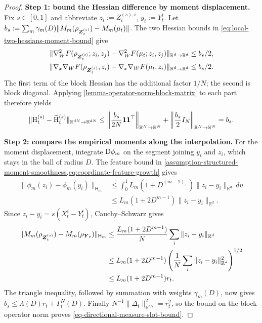 \begin{proof}
\noindent\textbf{Step 1: bound the Hessian difference by moment displacement.}
Fix $s\in[0,1]$ and abbreviate $z_i:=Z_t^{(s),i}$, $y_i:=Y_t^i$.
Let $b_s:=\sum_m\gamma_m(D)\|M_m(\rho_{\boldsymbol{Z}_t^{(s)}})-M_m(\mu_t)\|$.
The two Hessian bounds in \cref{eq:local-two-hessians-moment-bound} give
\[
\begin{aligned}
 \|\nabla_W^2F(\rho_{\boldsymbol{Z}_t^{(s)}};z_i,z_j)
             -\nabla_W^2F(\mu_t;z_i,z_j)\|_{\mathbb R^d\to\mathbb R^d}&\le b_s/2,\\
 \|\nabla_x\nabla_WF(\rho_{\boldsymbol{Z}_t^{(s)}},z_i)
             -\nabla_x\nabla_WF(\mu_t,z_i)\|_{\mathbb R^d\to\mathbb R^d}&\le b_s/2.
\end{aligned}
\]
The first term of the block Hessian has the additional factor $1/N$;
the second is block diagonal. Applying
\cref{lemma-operator-norm-block-matrix} to each part therefore yields
\[
 \|\mathrm{H}_t^{(s)}-\widetilde{\mathrm{H}}_t^{(s)}\|_{\mathbb R^{dN}\to\mathbb R^{dN}}
 \le\left\|\frac{b_s}{2N}\mathbf1\mathbf1^\top\right\|_{\mathbb R^N\to\mathbb R^N}
      +\left\|\frac{b_s}{2}I_N\right\|_{\mathbb R^N\to\mathbb R^N}=b_s.
\]

\par\noindent\textbf{Step 2: compare the empirical moments along the interpolation.}
For the moment displacement, integrate $\mathrm{D}\phi_m$ on the segment
joining $y_i$ and $z_i$, which stays in the ball of radius $D$.
The feature bound in
\cref{assumption-structured-moment-smoothness,eq:coordinate-feature-growth} gives
\[
\begin{aligned}
 \|\phi_m(z_i)-\phi_m(y_i)\|_{\mathsf H_m}
 &\le\int_0^1 L_m(1+D^{(m-1)_+})\|z_i-y_i\|_{\mathbb R^d}\,du\\
 &\le L_m(1+2D^{m-1})\|z_i-y_i\|_{\mathbb R^d}.
\end{aligned}
\]
Since $z_i-y_i=s(X_t^i-Y_t^i)$, Cauchy--Schwarz gives
\begin{equation}
\label{eq:paired-empirical-moment-displacement}
\begin{aligned}
 \|M_m(\rho_{\boldsymbol{Z}_t^{(s)}})-M_m(\rho_{\boldsymbol{Y}_t})\|_{\mathsf H_m}
 &\le\frac{L_m(1+2D^{m-1})}{N}\sum_i\|z_i-y_i\|_{\mathbb R^d}\\
 &\le L_m(1+2D^{m-1})
       \left(\frac1N\sum_i\|z_i-y_i\|_{\mathbb R^d}^2\right)^{1/2}\\
 &\le L_m(1+2D^{m-1})r_t.
\end{aligned}
\end{equation}
The triangle inequality, followed by summation with weights $\gamma_m(D)$,
now gives $b_s\le\Lambda(D)r_t+\Gamma_t^N(D)$.
Finally $N^{-1}\|\Delta_t\|_{\mathbb R^{dN}}^2=r_t^2$, so the bound on the block operator
norm proves \cref{eq-directional-measure-slot-bound}.
\end{proof}

